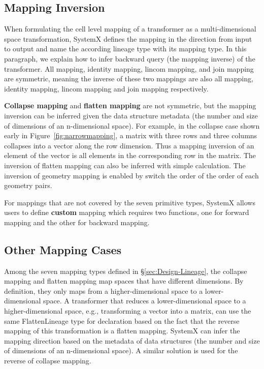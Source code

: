 \documentclass{sig-alternate}
\begin{document}
\subsection{Mapping Inversion}
When formulating the cell level mapping of a transformer as a multi-dimensional space transformation, SystemX defines
the mapping in the direction from input to output and name the according lineage type with its mapping type.
In this paragraph, we explain how to infer backward query (the mapping inverse) of the transformer.
All mapping, identity mapping, lincom mapping, and join mapping are symmetric, 
meaning the inverse of these two mappings are also all mapping, identity mapping, 
lincom mapping and join mapping respectively.

{\bf Collapse mapping} and {\bf flatten mapping} are not symmetric, but the mapping inversion can be inferred
given the data structure metadata (the number and size of dimensions of an n-dimensional space). For example, 
in the collapse case shown early in Figure~\ref{fig:narrowmapping}, a matrix with three rows and three columns
collapses into a vector along the row dimension. Thus a mapping inversion of an element of the vector
is all elements in the corresponding row in the matrix. 
The inversion of flatten mapping can also be inferred with simple calculation.
The inversion of geometry mapping is enabled by switch the order of the order of each geometry pairs.

For mappings that are not covered by the seven primitive types, SystemX allows users to define {\bf custom} mapping
which requires two functions, one for forward mapping and the other for backward mapping.

\subsection{Other Mapping Cases}
Among the seven mapping types defined in \S\ref{sec:Design-Lineage}, the collapse mapping and flatten mapping
map spaces that have different dimensions. By definition, they only maps from a higher-dimensional space to a lower-dimensional space.
A transformer that reduces a lower-dimensional space to a higher-dimensional space, e.g., transforming a vector into a matrix, can use
the same FlattenLineage type for declaration based on the fact that the reverse mapping of this transformation is a
flatten mapping. SystemX can infer the mapping direction based on the metadata of data structures 
(the number and size of dimensions of an n-dimensional space). 
A similar solution is used for the reverse of collapse mapping.
\end{document}
